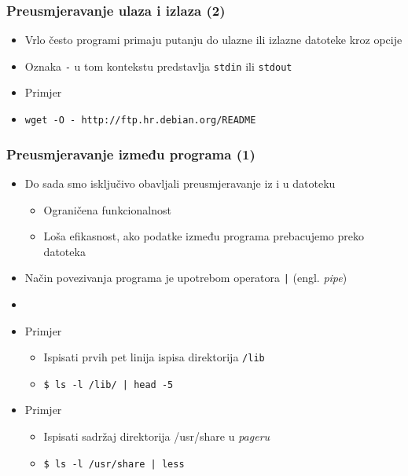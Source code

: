 \documentclass{beamer}
\newcommand{\shell}[1]{\texttt{#1}}
\begin{document}
\begin{frame}[t]
	\frametitle{Preusmjeravanje ulaza i izlaza (2)}
	\begin{itemize}
		\item Vrlo često programi primaju putanju do ulazne ili izlazne datoteke kroz opcije
		\item Oznaka \shell{-} u tom kontekstu predstavlja \shell{stdin} ili \shell{stdout}
	\end{itemize}
	\begin{itemize}
		\item Primjer
		\item[] \shell{wget -O - http://ftp.hr.debian.org/README}
	\end{itemize}
\end{frame}
  
\begin{frame}[t]
\frametitle{Preusmjeravanje između programa (1)}
\begin{itemize}
  \item Do sada smo isključivo obavljali preusmjeravanje iz i u datoteku
  \begin{itemize}
    \item Ograničena funkcionalnost
    \item Loša efikasnost, ako podatke između programa prebacujemo preko 
          datoteka
  \end{itemize}
  \item Način povezivanja programa je upotrebom operatora \shell{|} (engl. 
        \emph{pipe})
  \item[]
  \item Primjer
  \begin{itemize}
  	\item Ispisati prvih pet linija ispisa direktorija \shell{/lib}
    \item[] \shell{\$ ls -l /lib/ | head -5}
  \end{itemize}
  \item Primjer
  \begin{itemize}
  	\item Ispisati sadržaj direktorija /usr/share u \textit{pageru}
  	\item[] \shell{\$ ls -l /usr/share | less}
  \end{itemize}
\end{itemize}
\end{frame}
\end{document}
